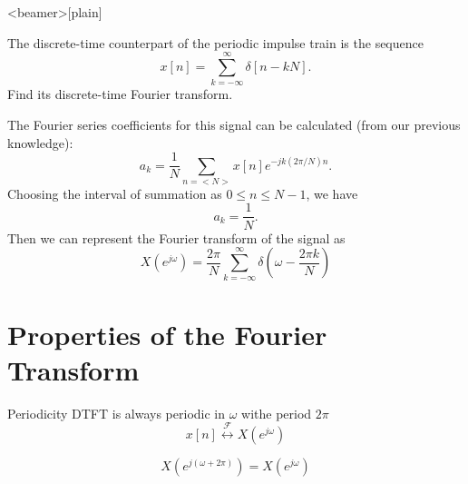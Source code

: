 \begin{frame}<beamer>[plain]
    \begin{figure}
        \centering
        
    \end{figure}
	
\end{frame}

\begin{frame}
	\begin{example}
		The discrete-time counterpart of the periodic impulse train is the sequence
		\begin{equation*}
			x[n] = \sum_{k=-\infty}^{\infty}\delta[n-kN].
		\end{equation*}
		Find its discrete-time Fourier transform.
	\end{example}

	{
		The Fourier series coefficients for this signal can be calculated (from our previous knowledge):
		\begin{equation*}
			a_k = \frac{1}{N}\sum_{n=<N>}x[n]e^{-jk(2\pi/N)n}.
		\end{equation*}
		\pause
		Choosing the interval of summation as $0 \leq n \leq N-1$, we have
		\begin{equation}
			a_k = \frac{1}{N}.
		\end{equation}
		\pause
		Then we can represent the Fourier transform of the signal as
		\begin{equation*}
			X(e^{j\omega}) = \frac{2\pi}{N}\sum_{k=-\infty}^{\infty}\delta\left(\omega - \frac{2\pi k}{N} \right)
		\end{equation*}
	}
\end{frame}

\section{Properties of the Fourier Transform}

\begin{frame}{Periodicity}
    DTFT is always periodic in $\omega$ withe period $2\pi$
    \begin{equation*}
        x[n] \overset{\mathcal{F}}{\leftrightarrow} X(e^{j\omega})
    \end{equation*}

    \begin{equation*}
        X\left(e^{j(\omega+2\pi)}\right) = X(e^{j\omega})
    \end{equation*}
\end{frame}

